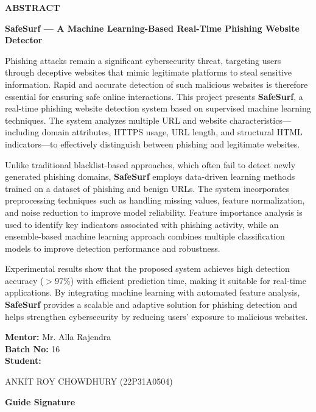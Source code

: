 \begin{center}
{\bfseries\fontsize{16}{18}\selectfont ABSTRACT}
\end{center}


\vspace{0.5cm}

\noindent
\textbf{SafeSurf — A Machine Learning-Based Real-Time Phishing Website Detector}

\vspace{0.5cm}

\noindent
Phishing attacks remain a significant cybersecurity threat, targeting users through deceptive websites that mimic legitimate platforms to steal sensitive information. Rapid and accurate detection of such malicious websites is therefore essential for ensuring safe online interactions. This project presents \textbf{SafeSurf}, a real-time phishing website detection system based on supervised machine learning techniques. The system analyzes multiple URL and website characteristics—including domain attributes, HTTPS usage, URL length, and structural HTML indicators—to effectively distinguish between phishing and legitimate websites.

\vspace{0.3cm}

\noindent
Unlike traditional blacklist-based approaches, which often fail to detect newly generated phishing domains, \textbf{SafeSurf} employs data-driven learning methods trained on a dataset of phishing and benign URLs. The system incorporates preprocessing techniques such as handling missing values, feature normalization, and noise reduction to improve model reliability. Feature importance analysis is used to identify key indicators associated with phishing activity, while an ensemble-based machine learning approach combines multiple classification models to improve detection performance and robustness.

\vspace{0.3cm}

\noindent
Experimental results show that the proposed system achieves high detection accuracy ($> 97\%$) with efficient prediction time, making it suitable for real-time applications. By integrating machine learning with automated feature analysis, \textbf{SafeSurf} provides a scalable and adaptive solution for phishing detection and helps strengthen cybersecurity by reducing users’ exposure to malicious websites.

\vspace{1cm}

\noindent
\textbf{Mentor:} Mr. Alla Rajendra\\
\textbf{Batch No:} 16\\
\textbf{Student:}

\vspace{0.2cm}

\noindent
ANKIT ROY CHOWDHURY (22P31A0504)

\vspace{1.5cm}

\begin{flushright}
\textbf{Guide Signature}
\end{flushright}